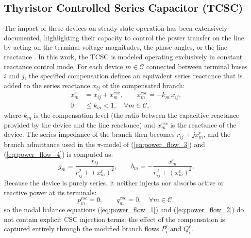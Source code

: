 \documentclass[letterpaper,journal]{IEEEtran}
\begin{document}
\subsection{Thyristor Controlled Series Capacitor (TCSC)}
\label{sec:tcsc}
The impact of these devices on steady-state operation has been extensively documented, highlighting their capacity to control the power transfer
on the line by acting on the terminal voltage magnitudes, the phase angles, or the line reactance \cite{ref12}. In this work, the TCSC is modeled
operating exclusively in constant reactance control mode. For each device $m \in \mathcal{C}$ connected between terminal buses $i$ and $j$,
the specified compensation defines an equivalent series reactance that is added to the series reactance $x_{ij}$ of the compensated branch:
\begin{equation}
	\begin{split}
		x^{e}_{m} & = x_{ij} + x^{csc}_{m}, \qquad x^{csc}_{m} = -k_m \, x_{ij}, \\
		0 & \le k_m < 1, \quad \forall m \in \mathcal{C},
	\end{split}
	\label{eq:csc_x}
\end{equation}
where $k_m$ is the compensation level (the ratio between the capacitive reactance provided by the device and the line reactance) and
$x^{csc}_m$ is the reactance of the device. The series impedance of the branch then becomes $r_{ij} + j x^{e}_m$,
and the branch admittance used in the $\pi$-model of (\ref{eq:power_flow_3}) and (\ref{eq:power_flow_4}) is computed as:
\begin{equation}
	\label{eq:csc_y}
	g_m = \frac{r_{ij}}{r_{ij}^2 + (x^{e}_m)^2}, \qquad
	b_m = -\frac{x^{e}_m}{r_{ij}^2 + (x^{e}_m)^2}.
\end{equation}
Because the device is purely series, it neither injects nor absorbs active or reactive power at its terminals:
\begin{equation}
	\label{eq:csc_pq}
	p^{csc}_m = 0, \qquad q^{csc}_m = 0, \quad \forall m \in \mathcal{C},
\end{equation}
so the nodal balance equations (\ref{eq:power_flow_1}) and (\ref{eq:power_flow_2}) do not contain explicit CSC injection terms:
the effect of the compensation is captured entirely through the modified branch flows $P_i^{\ell}$ and $Q_i^{\ell}$. 
\end{document}
